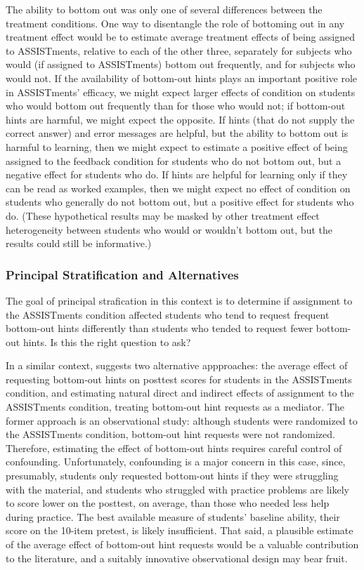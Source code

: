 \documentclass[]{article}
\begin{document}
The ability to bottom out was only one of several differences between the treatment conditions. One way to disentangle the role of bottoming out in any treatment effect would be to estimate average treatment effects of being assigned to ASSISTments, relative to each of the other three, separately for subjects who would (if assigned to ASSISTments) bottom out frequently, and for subjects who would not.
If the availability of bottom-out hints plays an important positive role in ASSISTments' efficacy, we might expect larger effects of condition on students who would bottom out frequently than for those who would not; if bottom-out hints are harmful, we might expect the opposite.
If hints (that do not supply the correct answer) and error messages are helpful, but the ability to bottom out is harmful to learning, then we might expect to estimate a positive effect of being assigned to the feedback condition for students who do not bottom out, but a negative effect for students who do. If hints are helpful for learning only if they can be read as worked examples, then we might expect no effect of condition on students who generally do not bottom out, but a positive effect for students who do.
(These hypothetical results may be masked by other treatment effect heterogeneity between students who would or wouldn't bottom out, but the results could still be informative.)

\subsubsection{Principal Stratification and Alternatives}
The goal of principal strafication in this context is to determine if assignment to the ASSISTments condition affected students who tend to request frequent bottom-out hints differently than students who tended to request fewer bottom-out hints.
Is this the right question to ask?

In a similar context, \citet{sales2021student} suggests two alternative appproaches: the average effect of requesting bottom-out hints on posttest scores for students in the ASSISTments condition, and estimating natural direct and indirect effects of assignment to the ASSISTments condition, treating bottom-out hint requests as a mediator.
The former approach is an observational study: although students were randomized to the ASSISTments condition, bottom-out hint requests were not randomized. Therefore, estimating the effect of bottom-out hints requires careful control of confounding.
Unfortunately, confounding is a major concern in this case, since, presumably, students only requested bottom-out hints if they were struggling with the material, and students who struggled with practice problems are likely to score lower on the posttest, on average, than those who needed less help during practice.
The best available measure of students' baseline ability, their score on the 10-item pretest, is likely insufficient.
That said, a plausible estimate of the average effect of bottom-out hint requests would be a valuable contribution to the literature, and a suitably innovative observational design \citep[e.g.][]{beck} may bear fruit.
\end{document}
